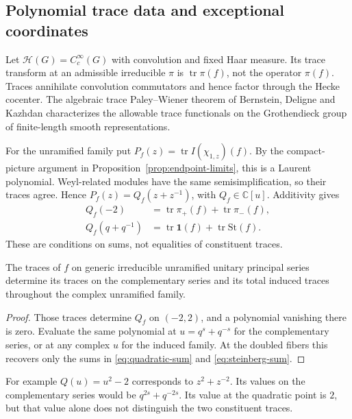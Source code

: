 \subsection{Polynomial trace data and exceptional coordinates}\label{subsec:pw-coordinates}
Let $\mathcal H(G)=C_c^\infty(G)$ with convolution and fixed Haar measure. Its trace transform at an admissible irreducible $\pi$ is $\operatorname{tr}\pi(f)$, not the operator $\pi(f)$. Traces annihilate convolution commutators and hence factor through the Hecke cocenter. The algebraic trace Paley--Wiener theorem of Bernstein, Deligne and Kazhdan \cite{BDK86} characterizes the allowable trace functionals on the Grothendieck group of finite-length smooth representations.

For the unramified family put $P_f(z)=\operatorname{tr}I(\chi_{1,z})(f)$. By the compact-picture argument in Proposition~\ref{prop:endpoint-limits}, this is a Laurent polynomial. Weyl-related modules have the same semisimplification, so their traces agree. Hence $P_f(z)=Q_f(z+z^{-1})$, with $Q_f\in\mathbb C[u]$. Additivity gives
\begin{align}
Q_f(-2)&=\operatorname{tr}\pi_+(f)+\operatorname{tr}\pi_-(f),\label{eq:quadratic-sum}\\
Q_f(q+q^{-1})&=\operatorname{tr}\mathbf1(f)+\operatorname{tr}\mathrm{St}(f).\label{eq:steinberg-sum}
\end{align}
These are conditions on sums, not equalities of constituent traces.
\begin{proposition}\label{prop:poly-uniqueness}
The traces of $f$ on generic irreducible unramified unitary principal series determine its traces on the complementary series and its total induced traces throughout the complex unramified family.
\end{proposition}
\begin{proof}
Those traces determine $Q_f$ on $(-2,2)$, and a polynomial vanishing there is zero. Evaluate the same polynomial at $u=q^s+q^{-s}$ for the complementary series, or at any complex $u$ for the induced family. At the doubled fibers this recovers only the sums in \eqref{eq:quadratic-sum} and \eqref{eq:steinberg-sum}.
\end{proof}
For example $Q(u)=u^2-2$ corresponds to $z^2+z^{-2}$. Its values on the complementary series would be $q^{2s}+q^{-2s}$. Its value at the quadratic point is $2$, but that value alone does not distinguish the two constituent traces.


